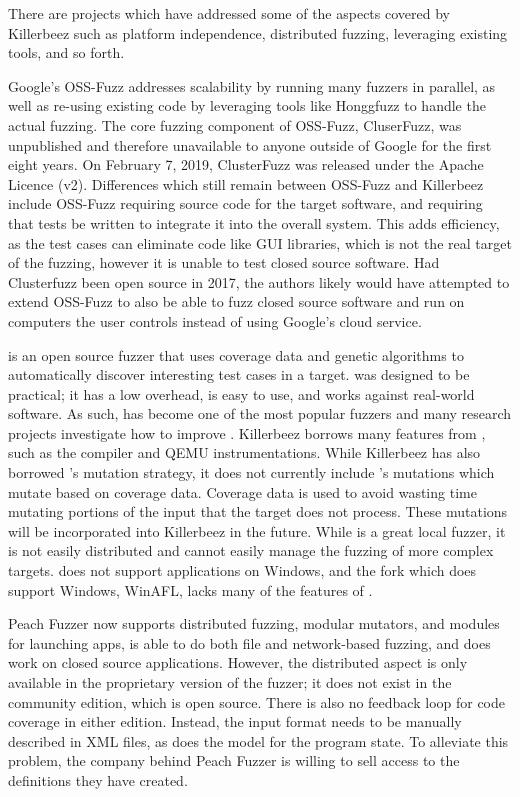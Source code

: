 There are projects which have addressed some of the aspects covered by Killerbeez
such as platform independence, distributed fuzzing, leveraging existing tools,
and so forth.

Google's OSS-Fuzz\cite{ossfuzz} addresses scalability by running many fuzzers
in parallel, as well as re-using existing code by leveraging tools like
Honggfuzz to handle the actual fuzzing. The core fuzzing component of OSS-Fuzz,
CluserFuzz, was unpublished and therefore unavailable to anyone outside of
Google for the first eight years.  On February 7, 2019, ClusterFuzz was released
under the Apache Licence (v2).\cite{clusterfuzzrelease}  Differences which still
remain between OSS-Fuzz and Killerbeez include OSS-Fuzz requiring source code for the
target software, and requiring that tests be written to integrate it
into the overall system. This adds efficiency, as the test cases can eliminate
code like GUI libraries, which is not the real target of the fuzzing, however
it is unable to test closed source software.  Had Clusterfuzz been open source
in 2017, the authors likely would have attempted to extend OSS-Fuzz to also be
able to fuzz closed source software and run on computers the user controls
instead of using Google's cloud service.

\AFL{}\cite{afl} is an open source fuzzer that uses coverage data and genetic
algorithms to automatically discover interesting test cases in a target.  \AFL{}
was designed to be practical; it has a low overhead, is easy to use, and works
against real-world software. As such, \AFL{} has become one of the most popular
fuzzers and many research projects investigate how to improve \AFL{}. Killerbeez
borrows many features from \AFL{}, such as the compiler and QEMU
instrumentations. While Killerbeez has also borrowed \AFL{}'s mutation strategy,
it does not currently include \AFL{}'s mutations which mutate based on coverage
data. Coverage data is used to avoid wasting time mutating portions of the input
that the target does not process. These mutations will be incorporated into
Killerbeez in the future.  While \AFL{} is a great local fuzzer, it is not
easily distributed and cannot easily manage the fuzzing of more complex targets.
\AFL{} does not support applications on Windows, and the \AFL{} fork which does
support Windows, WinAFL, lacks many of the features of \AFL{}.

Peach Fuzzer\cite{peach} now supports distributed fuzzing, modular mutators, and
modules for launching apps, is able to do both file and network-based fuzzing,
and does work on closed source applications.  However, the distributed aspect
is only available in the proprietary version of the fuzzer; it does not exist
in the community edition, which is open source. There is also no feedback loop
for code coverage in either edition.  Instead, the input format needs to be
manually described in XML files, as does the model for the program state. To
alleviate this problem, the company behind Peach Fuzzer is willing to sell
access to the definitions they have created.

